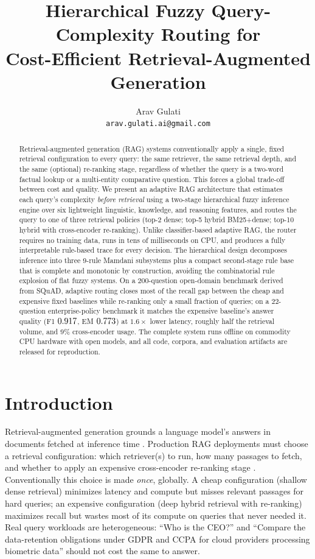 \documentclass[11pt]{article}
\title{\textbf{Hierarchical Fuzzy Query-Complexity Routing for\\Cost-Efficient Retrieval-Augmented Generation}}
\author{Arav Gulati\\\texttt{arav.gulati.ai@gmail.com}}
\date{}
\begin{document}
\maketitle

\begin{abstract}
Retrieval-augmented generation (RAG) systems conventionally apply a single,
fixed retrieval configuration to every query: the same retriever, the same
retrieval depth, and the same (optional) re-ranking stage, regardless of
whether the query is a two-word factual lookup or a multi-entity comparative
question. This forces a global trade-off between cost and quality. We present
an adaptive RAG architecture that estimates each query's complexity
\emph{before retrieval} using a two-stage hierarchical fuzzy inference engine
over six lightweight linguistic, knowledge, and reasoning features, and routes
the query to one of three retrieval policies (top-2 dense; top-5 hybrid
BM25+dense; top-10 hybrid with cross-encoder re-ranking). Unlike
classifier-based adaptive RAG, the router requires no training data, runs in
tens of milliseconds on CPU, and produces a fully interpretable rule-based
trace for every decision. The hierarchical design decomposes inference into
three 9-rule Mamdani subsystems plus a compact second-stage rule base that is
complete and monotonic by construction, avoiding the combinatorial rule
explosion of flat fuzzy systems. On a 200-question open-domain benchmark
derived from SQuAD, adaptive routing closes most of the recall gap between the
cheap and expensive fixed baselines while re-ranking only a small fraction of
queries; on a 22-question enterprise-policy benchmark it matches the expensive
baseline's answer quality (F1 $0.917$, EM $0.773$) at $1.6\times$ lower
latency, roughly half the retrieval volume, and $9\%$ cross-encoder usage. The
complete system runs offline on commodity CPU hardware with open models, and
all code, corpora, and evaluation artifacts are released for reproduction.
\end{abstract}

\section{Introduction}

Retrieval-augmented generation grounds a language model's answers in documents
fetched at inference time \citep{lewis2020rag}. Production RAG deployments
must choose a retrieval configuration: which retriever(s) to run, how many
passages to fetch, and whether to apply an expensive cross-encoder re-ranking
stage \citep{nogueira2019rerank}. Conventionally this choice is made
\emph{once}, globally. A cheap configuration (shallow dense retrieval)
minimizes latency and compute but misses relevant passages for hard queries; an
expensive configuration (deep hybrid retrieval with re-ranking) maximizes
recall but wastes most of its compute on queries that never needed it. Real
query workloads are heterogeneous: ``Who is the CEO?'' and ``Compare the
data-retention obligations under GDPR and CCPA for cloud providers processing
biometric data'' should not cost the same to answer.
\end{document}
